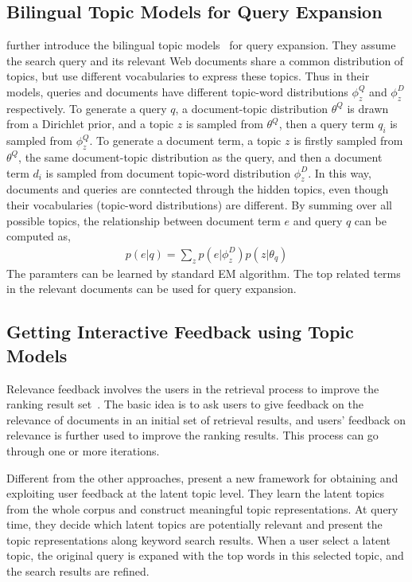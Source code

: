 \subsection{Bilingual Topic Models for Query Expansion}

\cite{Gao-2012} further introduce the bilingual topic models~\citep{Gao-2011} for query expansion. They assume the search query and its relevant Web documents share a common distribution of topics, but use different vocabularies to express these topics. Thus in their models, queries and documents have different topic-word distributions $\phi_z^Q$ and $\phi_z^D$ respectively. To generate a query $q$, a document-topic distribution $\theta^Q$ is drawn from a Dirichlet prior, and a topic $z$ is sampled from $\theta^Q$, then a query term $q_i$ is sampled from $\phi_z^Q$. To generate a document term, a topic $z$ is firstly sampled from $\theta^Q$, the same document-topic distribution as the query, and then a document term $d_i$ is sampled from document topic-word distribution $\phi_z^D$. In this way, documents and queries are conntected through the hidden topics, even though their vocabularies (topic-word distributions) are different. By summing over all possible topics, the relationship between document term $e$ and query $q$ can be computed as,
\begin{align}
p(e|q) = \sum_z p(e|\phi_z^D) p(z | \theta_q)
\end{align}
The paramters can be learned by standard EM algorithm. The top related terms in the relevant documents can be used for query expansion. 

\subsection{Getting Interactive Feedback using Topic Models}

Relevance feedback involves the users in the retrieval process to improve the ranking result set~\citep{Rocchio-1971}. The basic idea is to ask users to give feedback on the relevance of documents in an initial set of retrieval results, and users' feedback on relevance is further used to improve the ranking results. This process can go through one or more iterations. 

Different from the other approaches, \cite{Andrzejewski-2011} present a new framework for obtaining and exploiting user feedback at the latent topic level. They learn the latent topics from the whole corpus and construct meaningful topic representations. At query time, they decide which latent topics are potentially relevant and present the topic representations along keyword search results. When a user select a latent topic, the original query is expaned with the top words in this selected topic, and the search results are refined. 

